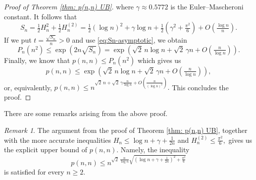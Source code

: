 \documentclass[12pt,a4paper]{amsart}
\numberwithin{equation}{section}
\theoremstyle{plain}
\theoremstyle{definition}
\theoremstyle{remark}
\newtheorem{re}[thm]{Remark}
\begin{document}
\begin{proof}[Proof of Theorem \ref{thm: p(n,n) UB}]
where $\gamma\approx0.5772$ is the Euler--Mascheroni constant. It follows that
\begin{equation}\label{eq:Sn-asymptotic}
S_n
=
\tfrac12H_n^2+\tfrac12H_n^{(2)}
=
\tfrac12(\log n)^2+\gamma\log n
+\tfrac12\left(\gamma^2+\tfrac{\pi^2}{6}\right)
+O\!\left(\tfrac{\log n}{n}\right).
\end{equation}
If we put $t=\frac{\sqrt{S_n}}{n}>0$ and use \eqref{eq:Sn-asymptotic}, we obtain
$$
P_n(n^2)
\le
\exp\left(
2n\sqrt{S_n}
\right)
=
\exp\left(
\sqrt2\,n\log n+\sqrt2\,\gamma n
+O\!\left(\tfrac{n}{\log n}\right)
\right).
$$
Finally, we know that $p(n,n)\le  P_n(n^2)$ which gives us
$$
p(n,n)
\le 
\exp\left(
\sqrt2\,n\log n+\sqrt2\,\gamma n
+O\!\left(\tfrac{n}{\log n}\right)
\right),
$$
or, equivalently,
$
p(n,n)\le n^{\sqrt2\,n+\sqrt2\,\gamma\frac{ n}{\log n}+O\!\left(\frac{n}{(\log n)^2}\right)}.$ This concludes the proof.
\end{proof}
There are some remarks arising from the above proof.
\begin{re}
The argument from the proof of Theorem \ref{thm: p(n,n) UB}, together with the more accurate inequalities
$
    H_n\le \log n+\gamma+\frac1{2n}$ and $H_n^{(2)}\le \frac{\pi^2}{6},$
gives us the explicit upper bound of $p(n,n)$. Namely, the inequality
$$
p(n,n)
\le
n^{
\sqrt2\,\frac{n}{\log n}
\sqrt{
\left(\log n+\gamma+\frac1{2n}\right)^2
+\frac{\pi^2}{6}
}
}
$$
is satisfied for every $n\ge 2$.
\end{re}
\end{document}
